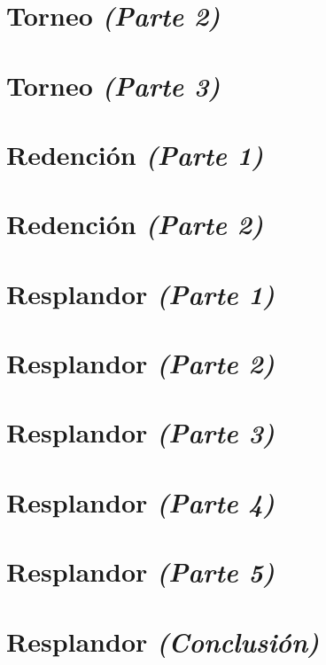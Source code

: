\documentclass[11pt]{book}
\begin{document}
\chapter{Torneo \emph{\mdseries(Parte 2)}}


\chapter{Torneo \emph{\mdseries(Parte 3)}}


\chapter{Redención \emph{\mdseries(Parte 1)}}


\chapter{Redención \emph{\mdseries(Parte 2)}}


\chapter{Resplandor \emph{\mdseries(Parte 1)}}


\chapter{Resplandor \emph{\mdseries(Parte 2)}}


\chapter{Resplandor \emph{\mdseries(Parte 3)}}


\chapter{Resplandor \emph{\mdseries(Parte 4)}}


\chapter{Resplandor \emph{\mdseries(Parte 5)}}


\chapter{Resplandor \emph{\mdseries(Conclusión)}}

\end{document}
